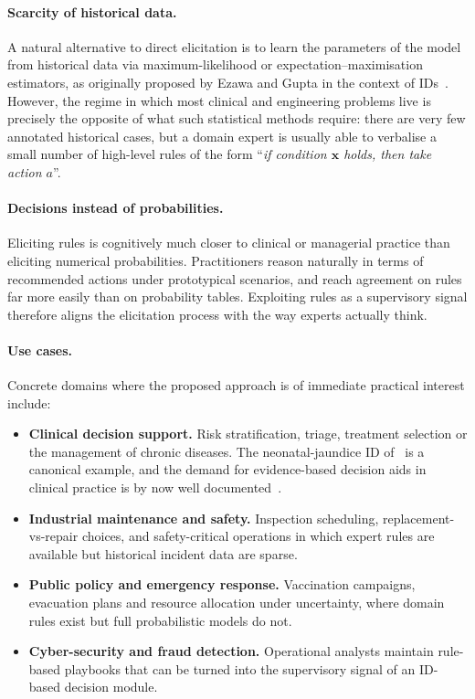\paragraph*{Scarcity of historical data.} A natural alternative to direct elicitation is to learn the parameters of the model from historical data via maximum-likelihood or expectation–maximisation estimators, as originally proposed by Ezawa and Gupta in the context of IDs~\cite{ezawa1997learning}. However, the regime in which most
clinical and engineering problems live is precisely the opposite of
what such statistical methods require: there are very few annotated
historical cases, but a domain expert is usually able to verbalise a small number of high-level rules of the form
``\textit{if condition $\mathbf{x}$ holds, then take action $a$}''.

\paragraph*{Decisions instead of probabilities.} Eliciting rules is
cognitively much closer to clinical or managerial practice than
eliciting numerical probabilities. Practitioners reason naturally in
terms of recommended actions under prototypical scenarios, and reach
agreement on rules far more easily than on probability tables.
Exploiting rules as a supervisory signal therefore aligns the
elicitation process with the way experts actually think.

\paragraph*{Use cases.} Concrete domains where the proposed approach
is of immediate practical interest include:
\begin{itemize}
    \item \textbf{Clinical decision support.}
          Risk stratification, triage, treatment selection or the
          management of chronic diseases. The neonatal-jaundice ID
          of~\cite{gomez2007jaundice} is a canonical example, and
          the demand for evidence-based decision aids in clinical
          practice is by now well documented~\cite{dowding2004evidence}.
    \item \textbf{Industrial maintenance and safety.}
          Inspection scheduling, replacement-vs-repair choices, and
          safety-critical operations in which expert rules are
          available but historical incident data are sparse.
    \item \textbf{Public policy and emergency response.}
          Vaccination campaigns, evacuation plans and resource
          allocation under uncertainty, where domain rules exist but
          full probabilistic models do not.
    \item \textbf{Cyber-security and fraud detection.}
          Operational analysts maintain rule-based playbooks that can
          be turned into the supervisory signal of an ID-based
          decision module.
\end{itemize}

